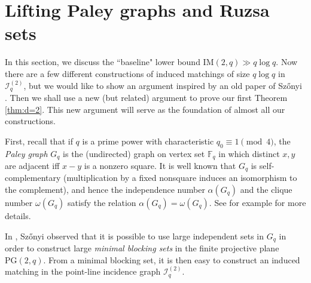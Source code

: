 \documentclass[12pt,reqno]{amsart}
\theoremstyle{plain}
\theoremstyle{definition}
\newcommand{\F}{\mathbb{F}}
\newcommand{\PG}{\mathrm{PG}}
\newcommand{\IM}{\mathrm{IM}}
\newcommand{\II}{\mathcal{I}}
\newcommand{\1}{\mathbf{1}}
\begin{document}
\section{Lifting Paley graphs and Ruzsa sets}\label{sec:prime-2d}
In this section, we discuss the ``baseline" lower bound $\IM(2 ,q)\gg q \log q$. Now there are a few different constructions of induced matchings of size $q\log q$ in $\II_q^{(2)}$, but we would like to show an argument inspired by an old paper of Sz\H{o}nyi \cite{Szonyi1992}. Then we shall use a new (but related) argument to prove our first Theorem \ref{thm:d=2}. This new argument will serve as the foundation of almost all our constructions.

First, recall that if $q$ is a prime power with characteristic $q_0\equiv 1\pmod 4$, the \emph{Paley graph} $G_q$ is the (undirected) graph on vertex set $\F_q$ in which
distinct $x,y$ are adjacent iff $x-y$ is a nonzero square. It is well known that $G_q$ is self-complementary (multiplication by a fixed nonsquare induces an isomorphism
to the complement), and hence the independence number $\alpha(G_q)$ and the clique number $\omega(G_q)$ satisfy the relation $\alpha(G_q)=\omega(G_q)$. See for example \cite{sachs1962selfcomplementary} for more details.

In \cite{Szonyi1992}, Sz\H{o}nyi observed that it is possible to use large independent sets in $G_q$ in order to construct large {\it{minimal blocking sets}} in the finite projective plane $\PG(2,q)$. From a minimal blocking  set, it is then easy to construct an induced matching in the point-line incidence graph $\II_q^{(2)}$. %
\end{document}
